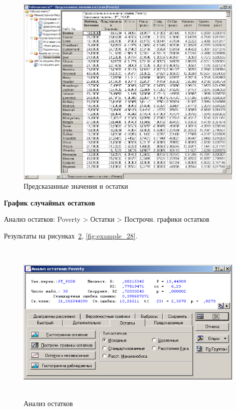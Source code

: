 \begin{figure}[!h]
  \centering

  \includegraphics[width=14cm]
  {inc/example_25.PNG}

  \caption{Предсказанные значения и остатки}

  \label{fig:example_25}
\end{figure}

\newpage

\begin{center}
  \textbf{График случайных остатков}
\end{center}

Анализ остатков: Poverty > Остатки > Построчн. графики остатков

Результаты на рисунках~\ref{fig:example_27}, \ref{fig:example_28}.

\begin{figure}[!h]
  \centering

  \includegraphics[height=8cm]
  {inc/example_27.PNG}

  \caption{Анализ остатков}

  \label{fig:example_27}
\end{figure}

